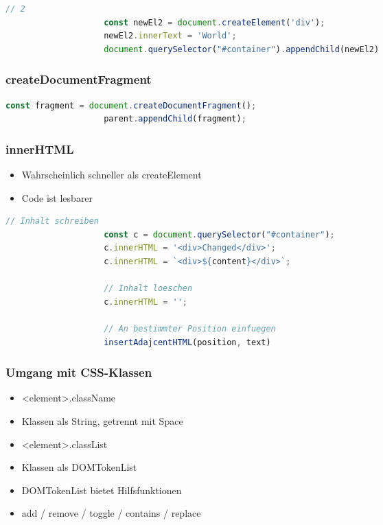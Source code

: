 \documentclass[a4paper, landscape, 8pt]{scrartcl}
\begin{document}
\begin{multicols*}{4}
\begin{lstlisting}[language=JavaScript]
                    // 2
                    const newEl2 = document.createElement('div');
                    newEl2.innerText = 'World';
                    document.querySelector("#container").appendChild(newEl2)
        \end{lstlisting}

        \subsubsection{createDocumentFragment}
        \begin{lstlisting}[language=JavaScript]
                    const fragment = document.createDocumentFragment();
                    parent.appendChild(fragment);
        \end{lstlisting}

        \subsubsection{innerHTML}
        \begin{itemize}
            \item Wahrscheinlich schneller als createElement
            \item Code ist lesbarer
        \end{itemize}
        \begin{lstlisting}[language=JavaScript]
                    // Inhalt schreiben
                    const c = document.querySelector("#container");
                    c.innerHTML = '<div>Changed</div>';
                    c.innerHTML = `<div>${content}</div>`;

                    // Inhalt loeschen
                    c.innerHTML = '';

                    // An bestimmter Position einfuegen
                    insertAdajcentHTML(position, text)
        \end{lstlisting}

        \subsubsection{Umgang mit CSS-Klassen}
        \begin{itemize}
            \item <element>.className
            \item Klassen als String, getrennt mit Space
            \item <element>.classList
            \item Klassen als DOMTokenList
            \item DOMTokenList bietet Hilfsfunktionen
            \item add / remove / toggle / contains / replace
        \end{itemize}


\end{multicols*}
\end{document}

